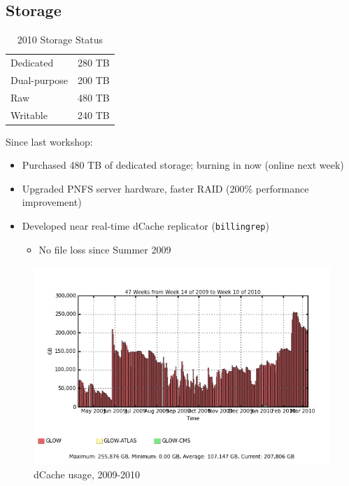 \documentclass{beamer}
\begin{document}
\subsection{Storage}
\begin{frame}
\begin{table}
\begin{tabular}{lr}
	\toprule
	Dedicated			&	 280 TB \\	 %
	Dual-purpose	&	 200 TB \\	 %
	\midrule
	Raw						&	 480 TB \\
	Writable			&	 240 TB \\
	\bottomrule
\end{tabular}
\caption{2010 Storage Status}
\label{2010_storage_status}
\end{table}

Since last workshop:
\begin{itemize}
	\item Purchased 480 TB of dedicated storage; burning in now (online next week)
	\item Upgraded PNFS server hardware, faster RAID (200\% performance improvement)
	\item Developed near real-time dCache replicator ({\tt billingrep})
	\begin{itemize}
		\item No file loss since Summer 2009
	\end{itemize}
\end{itemize}
\end{frame}

\begin{frame}
\begin{figure}
    \includegraphics[width=.8\textwidth]{Graphics/se_space_free.png}
    \caption{dCache usage, 2009-2010}
\end{figure}
\end{frame}
\end{document}

